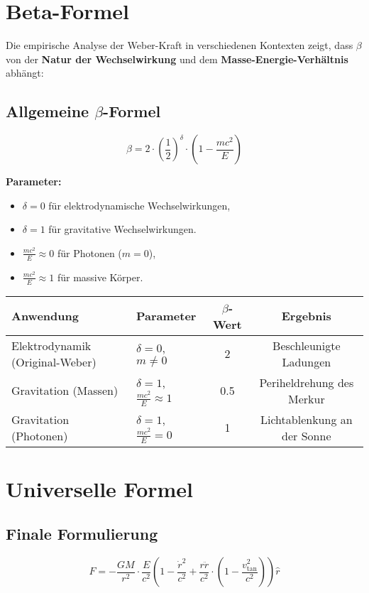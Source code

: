 \documentclass{article}
\begin{document}
\section{Beta-Formel}
Die empirische Analyse der Weber-Kraft in verschiedenen Kontexten zeigt, dass $\beta$ von der \textbf{Natur der Wechselwirkung} und dem \textbf{Masse-Energie-Verhältnis} abhängt:

\subsection*{Allgemeine $\beta$-Formel}
\[
\beta = 2 \cdot \left( \frac{1}{2} \right)^{\delta} \cdot \left(1 - \frac{m c^2}{E}\right)
\]

\textbf{Parameter:}
\begin{itemize}
    \item $\delta = 0$ für elektrodynamische Wechselwirkungen,
    \item $\delta = 1$ für gravitative Wechselwirkungen.
    \item $\frac{m c^2}{E} \approx 0$ für Photonen ($m = 0$),
    \item $\frac{m c^2}{E} \approx 1$ für massive Körper.
\end{itemize}

\begin{table}[H]
    \centering
    \begin{tabular}{lp{3cm}cc}
        \toprule
        Anwendung & Parameter & $\beta$-Wert & Ergebnis \\
        \midrule
        Elektrodynamik (Original-Weber) & $\delta = 0$, $m \neq 0$ & 2 & Beschleunigte Ladungen \\
        Gravitation (Massen) & $\delta = 1$, $\frac{m c^2}{E} \approx 1$ & 0.5 & Periheldrehung des Merkur \\
        Gravitation (Photonen) & $\delta = 1$, $\frac{m c^2}{E} = 0$ & 1 & Lichtablenkung an der Sonne \\
        \bottomrule
    \end{tabular}
\end{table}

\section{Universelle Formel}
\subsection*{Finale Formulierung}
\[
F = -\frac{GM}{r^2} \cdot \frac{E}{c^2} \left(1 - \frac{\dot{r}^2}{c^2} + \frac{r \ddot{r}}{c^2} \cdot \left(1 - \frac{v_{\text{tan}}^2}{c^2}\right) \right) \hat{r}
\]
\end{document}
